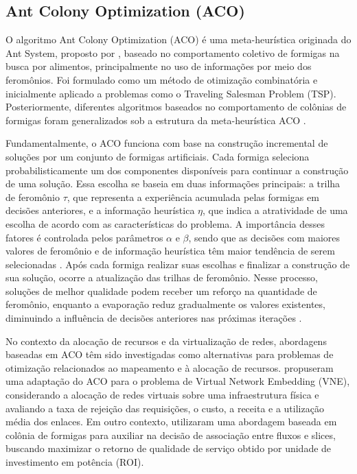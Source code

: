 \subsection{Ant Colony Optimization (ACO)}

O algoritmo Ant Colony Optimization (ACO) é uma meta-heurística originada do Ant System, proposto por , baseado no comportamento coletivo de formigas na busca por alimentos, principalmente no uso de informações por meio dos feromônios. Foi formulado como um método de otimização combinatória e inicialmente aplicado a problemas como o Traveling Salesman Problem (TSP). Posteriormente, diferentes algoritmos baseados no comportamento de colônias de formigas foram generalizados sob a estrutura da meta-heurística ACO \cite{dorigo1999ant}.

Fundamentalmente, o ACO funciona com base na construção incremental de soluções por um conjunto de formigas artificiais. Cada formiga seleciona probabilisticamente um dos componentes disponíveis para continuar a construção de uma solução. Essa escolha se baseia em duas informações principais: a trilha de feromônio $\tau$, que representa a experiência acumulada pelas formigas em decisões anteriores, e a informação heurística $\eta$, que indica a atratividade de uma escolha de acordo com as características do problema. A importância desses fatores é controlada pelos parâmetros $\alpha$ e $\beta$, sendo que as decisões com maiores valores de feromônio e de informação heurística têm maior tendência de serem selecionadas \cite{dorigo1999ant}. Após cada formiga realizar suas escolhas e finalizar a construção de sua solução, ocorre a atualização das trilhas de feromônio. Nesse processo, soluções de melhor qualidade podem receber um reforço na quantidade de feromônio, enquanto a evaporação reduz gradualmente os valores existentes, diminuindo a influência de decisões anteriores nas próximas iterações \cite{dorigo1999ant}.

No contexto da alocação de recursos e da virtualização de redes, abordagens baseadas em ACO têm sido investigadas como alternativas para problemas de otimização relacionados ao mapeamento e à alocação de recursos.  propuseram uma adaptação do ACO para o problema de Virtual Network Embedding (VNE), considerando a alocação de redes virtuais sobre uma infraestrutura física e avaliando a taxa de rejeição das requisições, o custo, a receita e a utilização média dos enlaces. Em outro contexto,  utilizaram uma abordagem baseada em colônia de formigas para auxiliar na decisão de associação entre fluxos e slices, buscando maximizar o retorno de qualidade de serviço obtido por unidade de investimento em potência (ROI).

